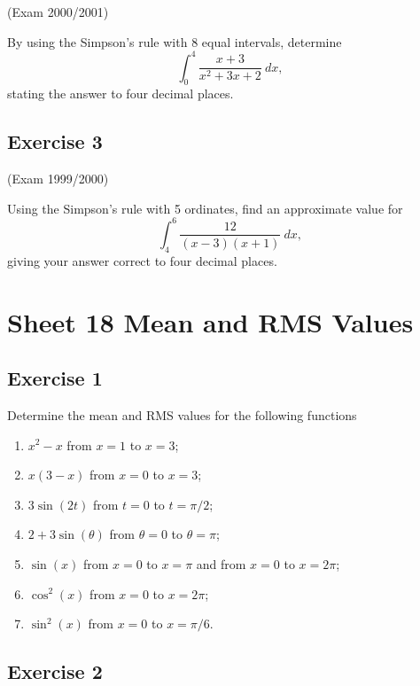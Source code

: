 \documentclass[
  11pt,
  oneside]{book}
\providecommand{\tightlist}{%
  \setlength{\itemsep}{0pt}\setlength{\parskip}{0pt}}
\newcommand{\slide}{}
\theoremstyle{definition}
\theoremstyle{definition}
\theoremstyle{definition}
\theoremstyle{definition}
\theoremstyle{remark}
\begin{document}
(Exam 2000/2001)

By using the Simpson's rule with 8 equal intervals, determine
\[
\int_0^4\frac{x+3}{x^2+3x+2}\ dx,
\]
stating the answer to four decimal places.

\slide

\subsection*{Exercise 3}\label{exercise-3-6}

(Exam 1999/2000)

Using the Simpson's rule with 5 ordinates, find an approximate value for
\[
\int_4^6\frac{12}{(x-3)(x+1)}\ dx,
\]
giving your answer correct to four decimal places.

\slide

\section{Sheet 18 Mean and RMS Values}\label{sheet-18-mean-and-rms-values}

\slide

\subsection*{Exercise 1}\label{exercise-1-9}

Determine the mean and RMS values for the following functions

\begin{enumerate}
\def\labelenumi{\arabic{enumi}.}
\tightlist
\item
  \(x^2-x\) from \(x=1\) to \(x=3\);
\item
  \(x(3-x)\) from \(x=0\) to \(x=3\);
\item
  \(3\sin(2t)\) from \(t=0\) to \(t=\pi/2\);
\item
  \(2+3\sin(\theta)\) from \(\theta=0\) to \(\theta=\pi\);
\item
  \(\sin(x)\) from \(x=0\) to \(x=\pi\) and from \(x=0\) to \(x=2\pi\);
\item
  \(\cos^2(x)\) from \(x=0\) to \(x=2\pi\);
\item
  \(\sin^2(x)\) from \(x=0\) to \(x=\pi/6\).
\end{enumerate}

\slide

\subsection*{Exercise 2}\label{exercise-2-9}
\end{document}
